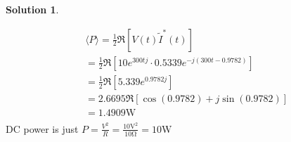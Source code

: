 \documentclass[10pt]{article}
\theoremstyle{definition}
\newtheorem{soln}{Solution}
\begin{document}
\begin{soln}
\begin{enumerate}[label=(\alph*)]
\begin{align*}
             & \langle P \rangle = \frac{1}{2}\Re\left[V(t)\tilde{I}^*(t)\right]      \\
             & = \frac{1}{2}\Re\left[10e^{300tj}\cdot0.5339e^{-j(300t-0.9782)}\right] \\
             & = \frac{1}{2}\Re\left[5.339e^{0.9782j}\right]                          \\
             & = 2.6695\Re\left[\cos(0.9782)+j\sin(0.9782)\right]                     \\
             & = 1.4909\unit{\watt}                                                   \\
          \end{align*}
          DC power is just $P=\frac{V^2}{R}=\frac{10\unit{\volt}^2}{10\unit{\ohm}}=10\unit{\watt}$
  \end{enumerate}
\end{soln}
\newpage
\end{document}
